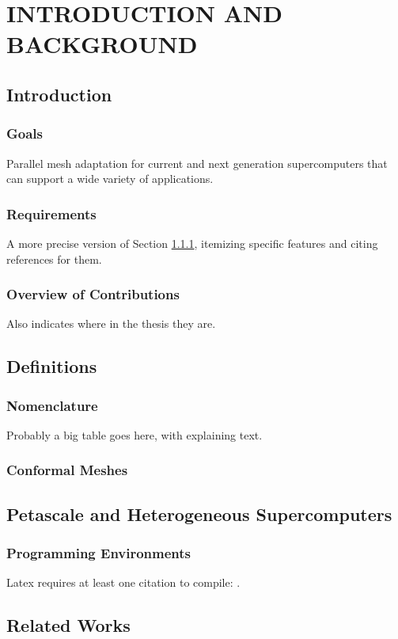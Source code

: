 
\chapter{INTRODUCTION AND BACKGROUND}
\label{chap:intro}

\section{Introduction}

\subsection{Goals}
\label{sec:intro_goals}

Parallel mesh adaptation for current and next generation supercomputers
that can support a wide variety of applications.

\subsection{Requirements}

A more precise version of Section \ref{sec:intro_goals},
itemizing specific features and citing references for them.

\subsection{Overview of Contributions}

Also indicates where in the thesis they are.

\section{Definitions}

\subsection{Nomenclature}

Probably a big table goes here, with explaining text.

\subsection{Conformal Meshes}

\section{Petascale and Heterogeneous Supercomputers}

\subsection{Programming Environments}

Latex requires at least one citation to
compile: \cite{edwards2013kokkos}.

\section{Related Works}

